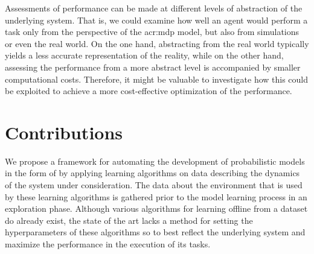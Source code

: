 Assessments of performance can be made at different levels of abstraction of the underlying system.
That is, we could examine how well an agent would perform a task only from the perspective of the \acrshort{acr:mdp} model, but also
from simulations or even the real world.
On the one hand, abstracting from the real world typically yields a less accurate representation of the reality, while on the other hand, assessing the performance from a more abstract level is accompanied by smaller computational costs.
Therefore, it might be valuable to investigate how this could be exploited to achieve a more cost-effective optimization of the performance.


\section{Contributions}
\label{sec:contribution}

We propose a framework for automating the development of probabilistic models in the form of  by applying learning algorithms on data describing the dynamics of the system under consideration.
The data about the environment that is used by these learning algorithms is gathered prior to the model learning process in an exploration phase.
Although various algorithms for learning  offline from a dataset \cite{shatkay1997learning, welch2003hidden, nikovski2002state} do already exist, the state of the art lacks a method for setting the hyperparameters of these algorithms so to best reflect the underlying system and maximize the performance in the execution of its tasks.

